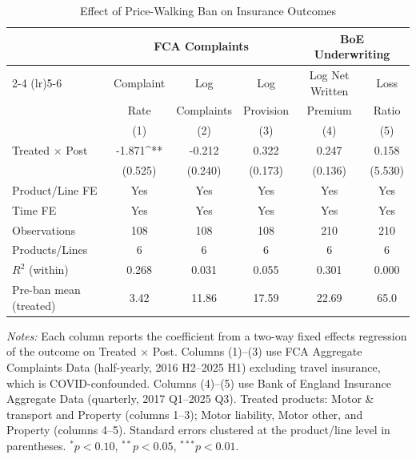 \begin{table}[t]
\centering
\begin{threeparttable}
\caption{Effect of Price-Walking Ban on Insurance Outcomes}
\label{tab:main}
\small
\begin{tabular}{lccccc}
\toprule
 & \multicolumn{3}{c}{FCA Complaints} & \multicolumn{2}{c}{BoE Underwriting} \\
\cmidrule(lr){2-4} \cmidrule(lr){5-6}
 & Complaint & Log & Log & Log Net Written & Loss \\
 & Rate & Complaints & Provision & Premium & Ratio \\
 & (1) & (2) & (3) & (4) & (5) \\
\midrule
Treated $\times$ Post & -1.871^{**} & -0.212 & 0.322 & 0.247 & 0.158 \\
 & (0.525) & (0.240) & (0.173) & (0.136) & (5.530) \\
\midrule
Product/Line FE & Yes & Yes & Yes & Yes & Yes \\
Time FE & Yes & Yes & Yes & Yes & Yes \\
Observations & 108 & 108 & 108 & 210 & 210 \\
Products/Lines & 6 & 6 & 6 & 6 & 6 \\
$R^2$ (within) & 0.268 & 0.031 & 0.055 & 0.301 & 0.000 \\
Pre-ban mean (treated) & 3.42 & 11.86 & 17.59 & 22.69 & 65.0 \\
\bottomrule
\end{tabular}
\begin{tablenotes}[flushleft]
\footnotesize
\item \textit{Notes:} Each column reports the coefficient from a two-way fixed effects regression of the outcome on Treated $\times$ Post. 
Columns (1)--(3) use FCA Aggregate Complaints Data (half-yearly, 2016 H2--2025 H1) excluding travel insurance, which is COVID-confounded. 
Columns (4)--(5) use Bank of England Insurance Aggregate Data (quarterly, 2017 Q1--2025 Q3). 
Treated products: Motor \& transport and Property (columns 1--3); Motor liability, Motor other, and Property (columns 4--5). 
Standard errors clustered at the product/line level in parentheses. 
$^{*}p<0.10$, $^{**}p<0.05$, $^{***}p<0.01$.
\end{tablenotes}
\end{threeparttable}
\end{table}
